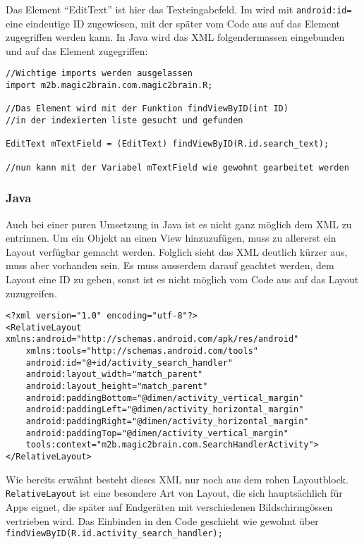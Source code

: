 Das Element "`EditText"' ist hier das Texteingabefeld. Im wird mit \verb|android:id=|  eine eindeutige ID zugewiesen, mit der später vom Code aus auf das Element zugegriffen werden kann.
In Java wird das XML folgendermassen eingebunden und auf das Element zugegriffen:
\begin{lstlisting}
//Wichtige imports werden ausgelassen
import m2b.magic2brain.com.magic2brain.R;

//Das Element wird mit der Funktion findViewByID(int ID)
//in der indexierten liste gesucht und gefunden

EditText mTextField = (EditText) findViewByID(R.id.search_text);

//nun kann mit der Variabel mTextField wie gewohnt gearbeitet werden
\end{lstlisting}

\subsubsection*{Java}
Auch bei einer puren Umsetzung in Java ist es nicht ganz möglich dem XML zu entrinnen. Um ein Objekt an einen View hinzuzufügen, muss zu allererst ein Layout verfügbar gemacht werden.
Folglich sieht das XML deutlich kürzer aus, muss aber vorhanden sein. Es muss ausserdem darauf geachtet werden, dem Layout eine ID zu geben, sonst ist es nicht möglich vom Code aus auf das Layout zuzugreifen.
\begin{lstlisting}
<?xml version="1.0" encoding="utf-8"?>
<RelativeLayout xmlns:android="http://schemas.android.com/apk/res/android"
    xmlns:tools="http://schemas.android.com/tools"
    android:id="@+id/activity_search_handler"
    android:layout_width="match_parent"
    android:layout_height="match_parent"
    android:paddingBottom="@dimen/activity_vertical_margin"
    android:paddingLeft="@dimen/activity_horizontal_margin"
    android:paddingRight="@dimen/activity_horizontal_margin"
    android:paddingTop="@dimen/activity_vertical_margin"
    tools:context="m2b.magic2brain.com.SearchHandlerActivity">
</RelativeLayout>
\end{lstlisting}

Wie bereits erwähnt besteht dieses XML nur noch aus dem rohen Layoutblock. \verb|RelativeLayout|  ist eine besondere Art von Layout, die sich hauptsächlich für Apps eignet, die später auf Endgeräten mit verschiedenen Bildschirmgössen vertrieben wird.
Das Einbinden in den Code geschieht wie gewohnt über\\ \verb|findViewByID(R.id.activity_search_handler);|  

